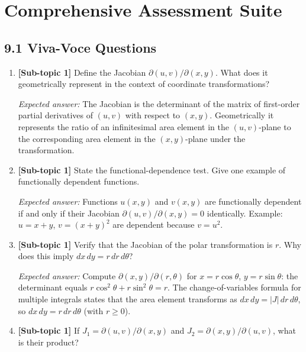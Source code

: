 \documentclass[12pt,a4paper]{article}
\begin{document}
\section{Comprehensive Assessment Suite}

\subsection*{9.1 Viva-Voce Questions}

\begin{enumerate}[leftmargin=*, label=\textbf{Q\arabic*.}]

  \item \textbf{[Sub-topic 1]} Define the Jacobian \( \partial(u,v)/\partial(x,y) \). What does it geometrically represent in the context of coordinate transformations?

  \textit{Expected answer:} The Jacobian is the determinant of the matrix of first-order partial derivatives of \( (u,v) \) with respect to \( (x,y) \). Geometrically it represents the ratio of an infinitesimal area element in the \( (u,v) \)-plane to the corresponding area element in the \( (x,y) \)-plane under the transformation.

  \item \textbf{[Sub-topic 1]} State the functional-dependence test. Give one example of functionally dependent functions.

  \textit{Expected answer:} Functions \( u(x,y) \) and \( v(x,y) \) are functionally dependent if and only if their Jacobian \( \partial(u,v)/\partial(x,y) = 0 \) identically. Example: \( u = x+y \), \( v = (x+y)^{2} \) are dependent because \( v = u^{2} \).

  \item \textbf{[Sub-topic 1]} Verify that the Jacobian of the polar transformation is \( r \). Why does this imply \( dx\,dy = r\,dr\,d\theta \)?

  \textit{Expected answer:} Compute \( \partial(x,y)/\partial(r,\theta) \) for \( x = r\cos\theta \), \( y = r\sin\theta \): the determinant equals \( r\cos^2\theta + r\sin^2\theta = r \). The change-of-variables formula for multiple integrals states that the area element transforms as \( dx\,dy = |J|\,dr\,d\theta \), so \( dx\,dy = r\,dr\,d\theta \) (with \( r \geq 0 \)).

  \item \textbf{[Sub-topic 1]} If \( J_1 = \partial(u,v)/\partial(x,y) \) and \( J_2 = \partial(x,y)/\partial(u,v) \), what is their product?


\end{enumerate}
\end{document}
